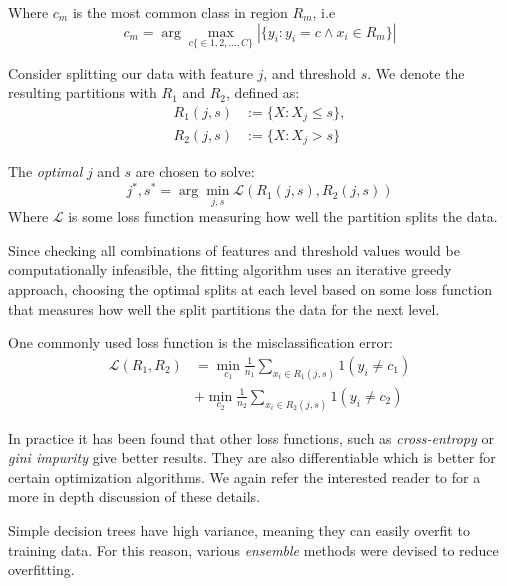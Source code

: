 \documentclass[a4paper, oneside, notitlepage]{book}
\begin{document}
Where $c_m$ is the most common class in region $R_m$, i.e
\begin{equation}
    c_m = \arg \max_{c \{\in {1, 2, ..., C}\}} |\{y_i : y_i = c \land x_i \in R_m\}|
\end{equation}

Consider splitting our data with feature $j$, and threshold $s$. We denote the resulting
partitions with $R_1$ and $R_2$, defined as: 
\begin{equation}
    \begin{aligned}
        R_1(j, s) &:= \{X : X_j \le s\}, \\
        R_2(j, s) &:= \{X : X_j >  s\} 
    \end{aligned}
\end{equation}

The \textit{optimal} $j$ and $s$ are chosen to solve:
\begin{equation}
    j^*, s^* = \arg \min_{j,s}  \mathcal{L}(R_1(j, s), R_2(j, s))
\end{equation}
Where $\mathcal{L}$ is some loss function measuring how well the partition splits the data.

Since checking all combinations of features and threshold values would be computationally infeasible, the fitting
algorithm uses an iterative greedy approach, choosing the optimal splits at each level based on some loss function that
measures how well the split partitions the data for the next level.

One commonly used loss function is the misclassification error:
\begin{equation}
    \begin{aligned}
        \mathcal{L}(R_1, R_2) &= \min_{c_1} \frac{1}{n_1} \sum_{x_i \in  R_1(j, s)} 1(y_i \neq c_1) \\
                    &+ \min_{c_2}\frac{1}{n_2} \sum_{x_i \in  R_2(j, s)} 1(y_i \neq c_2)
    \end{aligned}
\end{equation}

In practice it has been found that other loss functions, such as \textit{cross-entropy} or \textit{gini impurity} give better results.
They are also differentiable which is better for certain optimization algorithms. We again refer the interested reader to \cite{HASTIE2001}
for a more in depth discussion of these details.

Simple decision trees have high variance, meaning they can easily overfit to training data.
For this reason, various \textit{ensemble} methods were devised to reduce overfitting.
\end{document}
